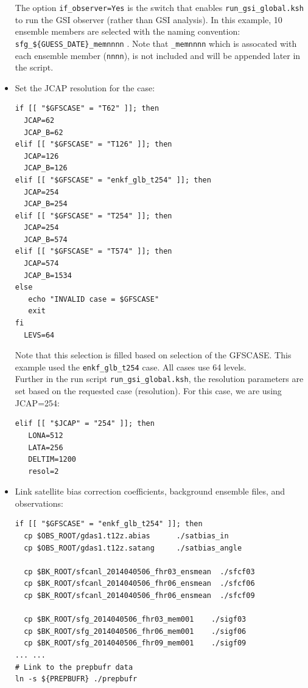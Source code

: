 \begin{itemize}
The option \verb|if_observer=Yes| is the switch that enables \verb|run_gsi_global.ksh| to run the GSI observer (rather than GSI analysis). In this example, 10 ensemble members are selected with the naming convention: \verb|sfg_${GUESS_DATE}_memnnnn| . Note that \verb|_memnnnn| which is assocated with each ensemble member (\verb|nnnn|), is not included and will be appended later in the script.\\

\item  Set the JCAP resolution for the case:
\begin{footnotesize}
\begin{verbatim}
if [[ "$GFSCASE" = "T62" ]]; then
  JCAP=62
  JCAP_B=62
elif [[ "$GFSCASE" = "T126" ]]; then
  JCAP=126
  JCAP_B=126
elif [[ "$GFSCASE" = "enkf_glb_t254" ]]; then
  JCAP=254
  JCAP_B=254
elif [[ "$GFSCASE" = "T254" ]]; then
  JCAP=254
  JCAP_B=574
elif [[ "$GFSCASE" = "T574" ]]; then
  JCAP=574
  JCAP_B=1534
else
   echo "INVALID case = $GFSCASE"
   exit
fi
  LEVS=64
\end{verbatim}
\end{footnotesize}
Note that this selection is filled based on selection of the GFSCASE. This example used the \verb|enkf_glb_t254| case. All cases use 64 levels. \\

Further in the run script \verb|run_gsi_global.ksh|, the resolution parameters are set based on the requested case (resolution). For this case, we are using JCAP=254:
\begin{footnotesize}
\begin{verbatim}
elif [[ "$JCAP" = "254" ]]; then
   LONA=512
   LATA=256
   DELTIM=1200
   resol=2
\end{verbatim}
\end{footnotesize}


\item Link satellite bias correction coefficients, background ensemble files, and observations:
\begin{footnotesize}
\begin{verbatim}
if [[ "$GFSCASE" = "enkf_glb_t254" ]]; then
  cp $OBS_ROOT/gdas1.t12z.abias      ./satbias_in
  cp $OBS_ROOT/gdas1.t12z.satang     ./satbias_angle

  cp $BK_ROOT/sfcanl_2014040506_fhr03_ensmean  ./sfcf03
  cp $BK_ROOT/sfcanl_2014040506_fhr06_ensmean  ./sfcf06
  cp $BK_ROOT/sfcanl_2014040506_fhr06_ensmean  ./sfcf09

  cp $BK_ROOT/sfg_2014040506_fhr03_mem001    ./sigf03
  cp $BK_ROOT/sfg_2014040506_fhr06_mem001    ./sigf06
  cp $BK_ROOT/sfg_2014040506_fhr09_mem001    ./sigf09
... ...
# Link to the prepbufr data
ln -s ${PREPBUFR} ./prepbufr


\end{verbatim}
\end{footnotesize}
\end{itemize}
